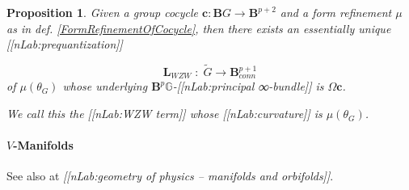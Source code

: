 \documentclass[12pt,titlepage]{article}
\theoremstyle{plain}
\newtheorem{prop}{Proposition}
\theoremstyle{definition}
\theoremstyle{remark}
\begin{document}
\begin{prop}
\label{WZWTermFromCocycle}\hypertarget{WZWTermFromCocycle}{}
Given a group cocycle $\mathbf{c} \colon \mathbf{B}G \to \mathbf{B}^{p+2}$ and a form refinement $\mu$ as in def. \ref{FormRefinementOfCocycle}, then there exists an essentially unique [[nLab:prequantization]]

\begin{displaymath}
\mathbf{L}_{WZW}
  \;\colon\;
  \tilde G \longrightarrow \mathbf{B}^{p+1}_{conn}
\end{displaymath}
of $\mu(\theta_G)$ whose underlying $\mathbf{B}^p\mathbb{G}$-[[nLab:principal ∞-bundle]] is $\Omega \mathbf{c}$.

We call this the \emph{[[nLab:WZW term]]} whose [[nLab:curvature]] is $\mu(\theta_G)$.

\end{prop}
\hypertarget{Manifolds}{}\paragraph*{{$V$-Manifolds}}\label{Manifolds}

See also at \emph{[[nLab:geometry of physics -- manifolds and orbifolds]]}.
\end{document}
